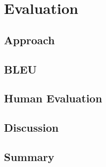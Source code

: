\chapter{Evaluation}
\section{Approach}
\section{BLEU}
\section{Human Evaluation}
\section{Discussion}
\section{Summary}